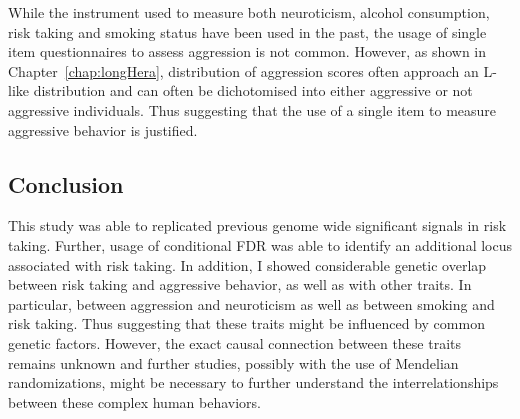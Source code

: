 While the instrument used to measure both neuroticism, alcohol consumption, risk taking and smoking status have been used in the past, the usage of single item questionnaires to assess aggression is not common.
However, as shown in Chapter~\ref{chap:longHera}, distribution of aggression scores often approach an L-like distribution and can often be dichotomised into either aggressive or not aggressive individuals.
Thus suggesting that the use of a single item to measure aggressive behavior is justified.

\subsection{Conclusion}
\label{sub:conclusion}

This study was able to replicated previous genome wide significant signals in risk taking.
Further, usage of conditional FDR was able to identify an additional locus associated with risk taking.
In addition, I showed considerable genetic overlap between risk taking and aggressive behavior, as well as with other traits.
In particular, between aggression and neuroticism as well as between smoking and risk taking.
Thus suggesting that these traits might be influenced by common genetic factors.
However, the exact causal connection between these traits remains unknown and further studies, possibly with the use of Mendelian randomizations, might be necessary to further understand the interrelationships between these complex human behaviors. 

